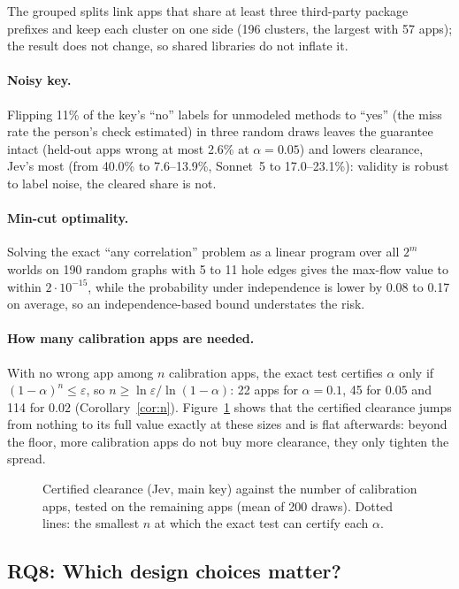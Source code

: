 The grouped splits link apps that share at least three third-party package prefixes and keep each cluster on one side (196 clusters, the largest with 57 apps); the result does not change, so shared libraries do not inflate it.
\paragraph{Noisy key.}
Flipping 11\% of the key's ``no'' labels for unmodeled methods to ``yes'' (the miss rate the person's check estimated) in three random draws leaves the guarantee intact (held-out apps wrong at most 2.6\% at $\alpha=0.05$) and lowers clearance, Jev's most (from 40.0\% to 7.6--13.9\%, Sonnet~5 to 17.0--23.1\%): validity is robust to label noise, the cleared share is not.
\paragraph{Min-cut optimality.}
Solving the exact ``any correlation'' problem as a linear program over all $2^m$ worlds on 190 random graphs with 5 to 11 hole edges gives the max-flow value to within $2\cdot10^{-15}$, while the probability under independence is lower by 0.08 to 0.17 on average, so an independence-based bound understates the risk.
\paragraph{How many calibration apps are needed.}
With no wrong app among $n$ calibration apps, the exact test certifies $\alpha$ only if $(1-\alpha)^n\le\varepsilon$, so $n\ge\ln\varepsilon/\ln(1-\alpha)$: 22 apps for $\alpha=0.1$, 45 for $0.05$ and 114 for $0.02$ (Corollary~\ref{cor:n}).
Figure~\ref{fig:learning} shows that the certified clearance jumps from nothing to its full value exactly at these sizes and is flat afterwards: beyond the floor, more calibration apps do not buy more clearance, they only tighten the spread.
\begin{figure}[t]

\caption{Certified clearance (Jev, main key) against the number of calibration apps, tested on the remaining apps (mean of 200 draws). Dotted lines: the smallest $n$ at which the exact test can certify each $\alpha$.}
\label{fig:learning}
\end{figure}

\subsection{RQ8: Which design choices matter?}
\label{sec:rq8}
